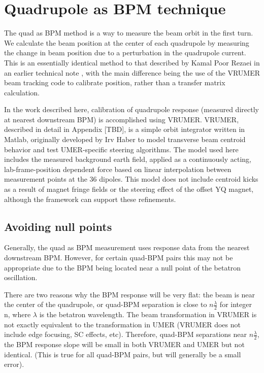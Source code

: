 \section{Quadrupole as BPM technique}

The quad as BPM method is a way to measure the beam orbit in the first turn. We calculate the beam position at the center of 
each quadrupole by measuring the change in beam position due to a perturbation in the quadrupole current. 
This is an essentially identical method to that described by Kamal Poor Rezaei in an earlier technical note \cite{KPRnote:2012}, 
with the main difference being the use of the VRUMER beam tracking code to calibrate position, rather than a transfer matrix calculation.  



In the work described here, calibration of quadrupole response (measured directly at nearest downstream BPM) is accomplished using VRUMER. VRUMER, described in detail in Appendix [TBD], 
is a simple orbit integrator written in Matlab, originally developed by Irv Haber to model transverse beam centroid behavior and test UMER-specific steering algorithms.
The model used here includes the measured background earth field, applied as a continuously 
acting, lab-frame-position dependent force based on linear interpolation between measurement points at the 36 dipoles.
This model does not include centroid kicks as a result of magnet fringe fields or the steering effect of the offset YQ magnet, although 
the framework can support these refinements.



\subsection{Avoiding null points} \label{sec:QAB:nulls}

Generally, the quad as BPM measurement uses response data from the nearest downstream BPM. However, for certain quad-BPM pairs this may not be appropriate due to the BPM being located near a null point of the betatron oscillation. 

There are two reasons why the BPM response will be very flat: the beam is near the center of the quadrupole, or quad-BPM separation is close to $n \frac{\lambda}{2}$ for integer n, where $\lambda$ is the betatron wavelength. The beam transformation in VRUMER is not exactly equivalent to the transformation in UMER (VRUMER does not include edge focusing, SC effects, etc). Therefore, quad-BPM separations near $n \frac{\lambda}{2}$, the BPM response slope will be small in both VRUMER and UMER but not identical. (This is true for all quad-BPM pairs, but will generally be a small error). 

